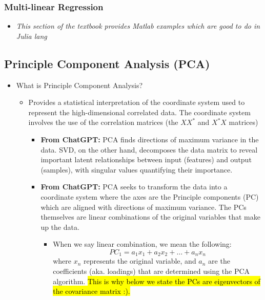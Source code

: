 \documentclass[11.5pt,a4paper]{article}
\begin{document}
\subsubsection*{Multi-linear Regression}

\begin{itemize}
    \item \textit{This section of the textbook provides Matlab examples which are good to do in Julia lang} 
\end{itemize}

\subsection*{Principle Component Analysis (PCA)}

\begin{itemize}
    \item What is Principle Component Analysis?
    \begin{itemize}
        \item Provides a statistical interpretation of the coordinate system used to represent the high-dimensional correlated data. The coordinate system involves the use of the correlation matrices (the $XX^*$ and $X^*X$ matrices)
        \begin{itemize}
            \item \textbf{From ChatGPT:} PCA finds directions of maximum variance in the data. SVD, on the other hand, decomposes the data matrix to reveal important latent relationships between input (features) and output (samples), with singular values quantifying their importance.
            \item \textbf{From ChatGPT:} PCA seeks to transform the data into a coordinate system where the axes are the Principle components (PC) which are aligned with directions of maximum variance. The PCs themselves are linear combinations of the original variables that make up the data.
            \begin{itemize}
                \item When we say linear combination, we mean the following:
                \begin{equation*}
                    PC_1 = a_1x_1 + a_2x_2 + \hdots + a_nx_n
                \end{equation*}
                where $x_n$ represents the original variable, and $a_n$ are the coefficients (aka. loadings) that are determined using the PCA algorithm. \hl{This is why below we state the PCs are eigenvectors of the covariance matrix :).}

\end{itemize}
\end{itemize}
\end{itemize}
\end{itemize}
\end{document}
